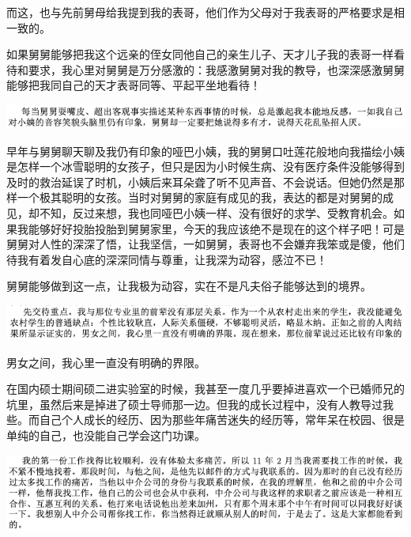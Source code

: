 \documentclass[9pt, b5paper]{article}
\begin{document}
而这，也与先前舅母给我提到我的表哥，他们作为父母对于我表哥的严格要求是相一致的。

如果舅舅能够把我这个远亲的侄女同他自己的亲生儿子、天才儿子我的表哥一样看待和要求，我心里对舅舅是万分感激的：我感激舅舅对我的教导，也深深感激舅舅能够把我同自己的天才表哥同等、平起平坐地看待！
\begin{center}
\includegraphics[width=.9\linewidth]{./pic/backups_plans_20210412_114832.png}
\end{center}

早年与舅舅聊天聊及我仍有印象的哑巴小姨，我的舅舅口吐莲花般地向我描绘小姨是怎样一个冰雪聪明的女孩子，但只是因为小时候生病、没有医疗条件没能够得到及时的救治延误了时机，小姨后来耳朵聋了听不见声音、不会说话。但她仍然是那样一个极其聪明的女孩。当时对舅舅的家庭有成见的我，表达的都是对舅舅的成见，却不知，反过来想，我也同哑巴小姨一样、没有很好的求学、受教育机会。如果我能够好好投胎投胎到舅舅家里，今天的我应该绝不是现在的这个样子吧！可是舅舅对人性的深深了悟，让我坚信，一如舅舅，表哥也不会嫌弃我笨或是傻，他们待我有着发自心底的深深同情与尊重，让我深为动容，感泣不已！

舅舅能够做到这一点，让我极为动容，实在不是凡夫俗子能够达到的境界。

\begin{center}
\includegraphics[width=.9\linewidth]{./pic/backups_plans_20210412_104246.png}
\end{center}

男女之间，我心里一直没有明确的界限。

在国内硕士期间硕二进实验室的时候，我甚至一度几乎要掉进喜欢一个已婚师兄的坑里，虽然后来是掉进了硕士导师那一边。但我的成长过程中，没有人教导过我些。而自己个人成长的经历、因为那些年痛苦迷失的经历等，常年呆在校园、很是单纯的自己，也没能自己学会这门功课。

\begin{center}
\includegraphics[width=.9\linewidth]{./pic/backups_plans_20210412_104359.png}
\end{center}
\end{document}
